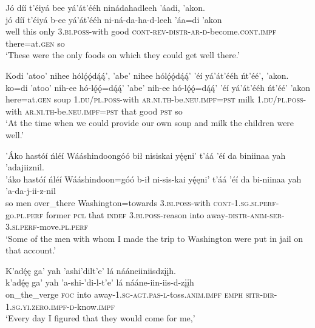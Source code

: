 \ea\label{ex:text7-14-17}
Jó díí t’éiyá bee yá’át’ééh ninádahadleeh ’áadi, ’akon.\\
\gll jó	díí	t’éiyá	b-ee	yá’át’ééh	ni-ná-da-ha-d-leeh	’áa=di	’akon\\
     well	this	only	3.\textsc{bi}.\textsc{poss}-with	good	\textsc{cont}-\textsc{rev}-\textsc{distr}-\textsc{ar}-\textsc{d}-become.\textsc{cont}.\textsc{impf}	there=at.\textsc{gen}	so\\
\glt `These were the only foods on which they could get well there.'
\z

\ea\label{ex:text7-14-18}
Kodi ’atoo’ nihee hólǫ́ǫ́dą́ą́’, ’abe’ nihee hólǫ́ǫ́dą́ą́’ ’éí yá’át’ééh ńt’éé’, ’akon.\\
\gll ko=di	’atoo’	nih-ee	hó-lǫ́ǫ́=dą́ą́’	’abe’	nih-ee	hó-lǫ́ǫ́=dą́ą́’	’éí	yá’át’ééh	ńt’éé’	’akon\\
     here=at.\textsc{gen}	soup	1.\textsc{du}/\textsc{pl}.\textsc{poss}-with	\textsc{ar}.\textsc{ni}.\textsc{th}-be.\textsc{neu}.\textsc{impf}=\textsc{pst}	milk	1.\textsc{du}/\textsc{pl}.\textsc{poss}-with	\textsc{ar}.\textsc{ni}.\textsc{th}-be.\textsc{neu}.\textsc{impf}=\textsc{pst}	that	good	\textsc{pst}	so\\
\glt `At the time when we could provide our own soup and milk the children were well.'
\z

\ea\label{ex:text7-15-1}
’Áko hastóí ńléí Wááshindoongóó bił nisiskai yę́ęni’ t’áá ’éí da biniinaa yah ’adajiiznil.\\
\gll ’áko	hastóí	ńléí	Wááshindoon=góó	b-ił	ni-sis-kai	yę́ęni’	t’áá ’éí	da	bi-niinaa	yah	’a-da-j-ii-z-nil\\
     so	men	over\_there	Washington=towards	3.\textsc{bi}.\textsc{poss}-with	\textsc{cont}-1.\textsc{sg}.\textsc{si}.\textsc{perf}-go.\textsc{pl}.\textsc{perf}	former	\textsc{pcl} that	\textsc{indef}	3.\textsc{bi}.\textsc{poss}-reason	into	away-\textsc{distr}-\textsc{anim}-\textsc{ser}-3.\textsc{si}.\textsc{perf}-move.\textsc{pl}.\textsc{perf}\\
\glt `Some of the men with whom I made the trip to Washington were put in jail on that account.'
\z

\ea\label{ex:text7-15-2}
K’adę́ę ga’ yah ’ashi’dilt’e’ lá nááneiiniisdzįįh.\\
\gll k’adę́ę	ga’	yah	’a-shi-’di-l-t’e’	lá	nááne-iin-iis-d-zįįh\\
     on\_the\_verge	\textsc{foc}	into	away-1.\textsc{sg}-\textsc{agt}.\textsc{pas}-\textsc{l}-toss.\textsc{anim}.\textsc{impf}	\textsc{emph}	\textsc{sitr}-\textsc{dir}-1.\textsc{sg}.\textsc{yi}.\textsc{zero}.\textsc{impf}-\textsc{d}-know.\textsc{impf}\\
\glt `Every day I figured that they would come for me,'
\z

